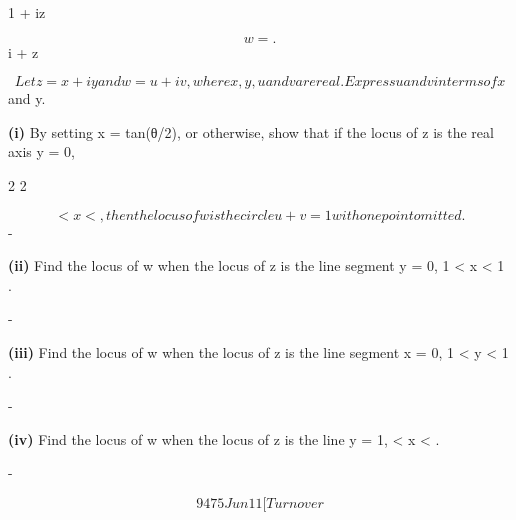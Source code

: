 \documentclass[12pt]{article}
\begin{document}
\begin{flushleft}
1 + iz\par
\[w = .\]
i + z\par
\[Let z = x + iy and w = u + iv, where x, y, u and v are real. Express u and v in terms of x\]
and y.\par
\textbf{(i)} By setting x = tan(θ/2), or otherwise, show that if the locus of z is the real axis y = 0,\par
2 2\par
\[< x < , then the locus of w is the circle u + v = 1 with one point omitted.\]
-\infty \infty\par
\textbf{(ii)} Find the locus of w when the locus of z is the line segment y = 0, 1 < x < 1 .\par
-\par
\textbf{(iii)} Find the locus of w when the locus of z is the line segment x = 0, 1 < y < 1 .\par
-\par
\textbf{(iv)} Find the locus of w when the locus of z is the line y = 1, < x < .\par
-\infty \infty\par
\[9475 Jun11 [Turn over\]
\end{flushleft}
\end{document}
